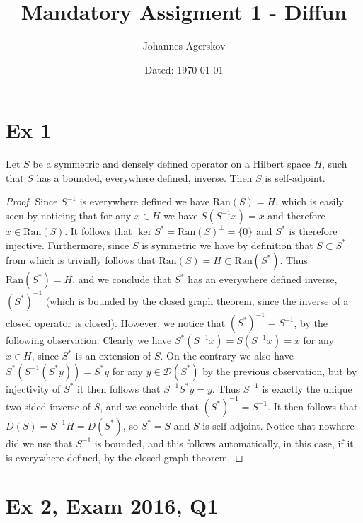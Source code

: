 \documentclass[a4paper,11pt]{article}
\author{Johannes Agerskov}
\date{Dated: \today}
\title{Mandatory Assigment 1 - Diffun}
\newcommand{\Ran}[1]{\text{Ran}\left(#1\right)}
\numberwithin{equation}{section}
\begin{document}
\maketitle	

\section*{Ex 1}
\setcounter{section}{1}
Let $ S $ be a symmetric and densely defined operator on a Hilbert space $ H $, such that $ S $ has a bounded, everywhere defined, inverse. Then $ S $ is self-adjoint.
\begin{proof}
	Since $ S^{-1} $ is everywhere defined we have $ \Ran{S}=H $, which is easily seen by noticing that for any $ x\in H $ we have $ S(S^{-1}x)=x $ and therefore $ x\in \Ran{S} $. It follows that $ \ker{S^*}=\Ran{S}^\perp=\{0\} $ and $ S^* $ is therefore injective. Furthermore, since $ S $ is symmetric we have by definition that $ S\subset S^* $ from which is trivially follows that $ \Ran{S}=H\subset\Ran{S^*} $. Thus $ \Ran{S^*}=H $, and we conclude that $ S^* $ has an everywhere defined inverse, $ (S^*)^{-1} $ (which is bounded by the closed graph theorem, since the inverse of a closed operator is closed). However, we notice that $ (S^*)^{-1}=S^{-1} $, by the following observation: Clearly we have $ S^*(S^{-1}x)=S(S^{-1}x)=x $ for any $ x\in H $, since $ S^* $ is an extension of $ S $. On the contrary we also have $ S^*(S^{-1}(S^*y))=S^*y $ for any $ y\in\mathcal{D}(S^*) $ by the previous observation, but by injectivity of $ S^* $ it then follows that $ S^{-1}S^*y=y $. Thus $ S^{-1} $ is exactly the unique two-sided inverse of $ S $, and we conclude that $ (S^*)^{-1}=S^{-1} $. It then follows that $ D(S)=S^{-1}H=D(S^*) $, so $ S^*=S $ and $ S $ is self-adjoint. Notice that nowhere did we use that $ S^{-1} $ is bounded, and this follows automatically, in this case, if it is everywhere defined, by the closed graph theorem.
\end{proof}

\section*{Ex 2, Exam 2016, Q1}
\setcounter{section}{2}
\end{document}
